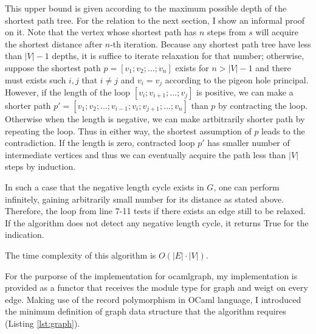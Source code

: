 \documentclass[a4paper,12pt]{article}
\begin{document}
This upper bound is given according to the maximum possible depth of
the shortest path tree. For the relation to the next section, I show
an informal proof on it. Note that the vertex whose shortest path has
$n$ steps from $s$ will acquire the shortest distance after $n$-th
iteration. Because any shortest path tree have less than $|V|-1$
depths, it is suffice to iterate relaxation for that number;
otherwise, suppose the shortest path $p=[v_1;v_2;...;v_n]$ exists for
$n>|V|-1$ and there must exists such $i,j$ that $i\ne j$ and $v_i=v_j$
according to the pigeon hole principal. However, if the length of the
loop $[v_i;v_{i+1};...;v_j]$ is positive, we can make a shorter path
$p'=[v_1;v_2;...;v_{i-1};v_i;v_{j+1};...;v_n]$ than $p$ by contracting
the loop. Otherwise when the length is negative, we can make
artbitrarily shorter path by repeating the loop. Thus in either way,
the shortest assumption of $p$ leads to the contradiction. If the
length is zero, contracted loop $p'$ has smaller number of
intermediate vertices and thus we can eventually acquire the path less
than $|V|$ steps by induction.

In such a case that the negative length cycle exists in $G$, one can
perform \relaxBF infinitely, gaining arbitrarily small number for its
distance as stated above. Therefore, the loop from line 7-11 tests if
there exists an edge still to be relaxed. If the algorithm does not
detect any negative length cycle, it returns True for the indication.

The time complexity of this algorithm is $O(|E|\cdot|V|)$.

\newcommand{\mainBF}{\ensuremath{\mbox{\sc Bellman-Ford}}}
\begin{algorithm}
\caption{$\mainBF(G,s,l)$}\label{alg:bf}
\begin{algorithmic}[1]
\ENDFOR
\ENDFOR
{}
\ENDIF
\ENDFOR
{}
\end{algorithmic}
\end{algorithm}

For the purporse of the implementation for ocamlgraph, my
implementation is provided as a functor that receives the module type
for graph and weigt on every edge. Making use of the record
polymorphism in OCaml language, I introduced the minimum definition of
graph data structure that the algorithm requires (Listing
\ref{lst:graph}).
\end{document}
